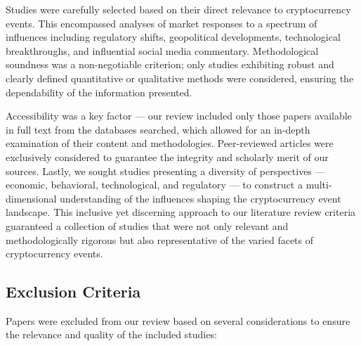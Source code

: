 \documentclass{article}
\begin{document}
Studies were carefully selected based on their direct relevance to cryptocurrency events. This encompassed analyses of market responses to a spectrum of influences including regulatory shifts, geopolitical developments, technological breakthroughs, and influential social media commentary. Methodological soundness was a non-negotiable criterion; only studies exhibiting robust and clearly defined quantitative or qualitative methods were considered, ensuring the dependability of the information presented.

Accessibility was a key factor — our review included only those papers available in full text from the databases searched, which allowed for an in-depth examination of their content and methodologies. Peer-reviewed articles were exclusively considered to guarantee the integrity and scholarly merit of our sources. Lastly, we sought studies presenting a diversity of perspectives — economic, behavioral, technological, and regulatory — to construct a multi-dimensional understanding of the influences shaping the cryptocurrency event landscape. This inclusive yet discerning approach to our literature review criteria guaranteed a collection of studies that were not only relevant and methodologically rigorous but also representative of the varied facets of cryptocurrency events.

\subsection{Exclusion Criteria}

Papers were excluded from our review based on several considerations to ensure the relevance and quality of the included studies:
\end{document}
